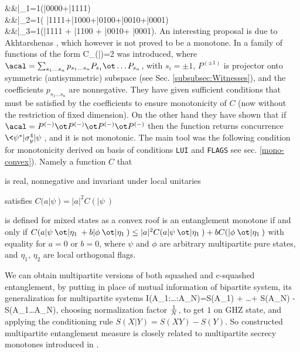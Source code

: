 \documentclass[twocolumn,aps,rmp]{revtex4}
\begin{document}
\ben
&&|\Phi_1\>={1\over {}}(|0000\>+|1111\>) \nonumber \\
&&|\Phi_2\>={1\over {}}( |1111\>+|1000\>+|0100\>+|0010\>+|0001\>)
\nonumber \\
&&|\Phi_3\>={1}(|1111\> + |1100\> + |0010\>+ |0001\>).
\een
 An interesting proposal is due to Akhtarshenas
\cite{Akhtarshenas2003-multiconc}, which however is not proved to be
a monotone. In \cite{MintertKB2004-multi,DemkowiczBKM2006-multi}
a family of functions of the form
\be
C_{\acal}(|\psi\>)=2\sqrt{\<\psi|\ot \<\psi| {\acal} |\psi\>\ot |\psi\>}
\ee
was introduced, where $\acal=\sum_{s_1 \ldots s_n} p_{s_1 \ldots s_n}P_{s_1}
\ot \ldots P_{s_n}$,
with $s_i=\pm 1$, $P^{(\pm1)}$ is projector onto symmetric (antisymmetric)
subspace (see Sec. \ref{subsubsec:Witnesses}), and the coefficients $p_{s_1\ldots s_n}$ are nonnegative.
They have given sufficient conditions that must be satisfied by the coefficients to ensure monotonicity of $C$ (now without the restriction
of fixed dimension). On the other hand they have shown that  if $\acal = P^{(-)}\ot P^{(-)}\ot P^{(-)}\ot P^{(-)}$
then the function returns concurrence $\<\psi^*|\sigma_y^4|\psi\>$, and it is not monotonic.
The main tool was the following condition for monotonicity derived on basis of conditions {\tt LUI} and {\tt FLAGS} see sec. \ref{mono-convex}).
Namely  a function $C$ that\bei
\item is real, nonnegative and invariant under local unitaries
\item satisfies $C(a|\psi\>) = |a|^2C(|\psi\>)$
\item is defined for mixed states as a convex roof
\eei
is an entanglement monotone if and only if
$C(a|\psi\>\ot |\eta_1\> +b|\phi\>\ot |\eta_1\>) \leq |a|^2 C(a|\psi\>\ot |\eta_1\>) +bC(|\phi\>\ot |\eta_1\>)$
with equality for $a=0$ or $b=0$, where $\psi$  and $\phi$ are
arbitrary multipartite pure states, and $\eta_1$,  $\eta_2$  are local
orthogonal flags.

We can obtain multipartite versions of both squashed and c-squashed entanglement,
by putting in place of mutual information of bipartite system,
its generalization for multipartite systems \cite{multisquash}
\be
I(A_1:\ldots :A_N)=S(A_1) + \ldots + S(A_N) - S(A_1\ldots A_N),
\ee
choosing normalization factor ${1\over N}$, to get $1$ on GHZ state,
and applying the conditioning rule $S(X|Y)=S(XY)-S(Y)$.
So constructed multipartite entanglement measure
is closely related to multipartite secrecy monotones introduced in
\cite{Cerf-secr-mono}.
\end{document}
